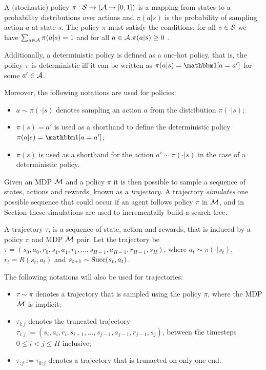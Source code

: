     \begin{defn}
        \label{def:policy}
        A \textnormal{(stochastic) policy} $\pi:\mathcal{S}\rightarrow (\mathcal{A} \rightarrow [0,1])$ is a mapping from states to a probability distributions over actions and $\pi(a|s)$ is the probability of sampling action $a$ at state $s$. The policy $\pi$ must satisfy the conditions: for all $s \in \mathcal{S}$ we have $\sum_{a\in\mathcal{A}} \pi(a|s) = 1$ and for all $a\in\mathcal{A}. \pi(a|s)\geq 0$ . 
        
        Additionally, a \textnormal{deterministic policy} is defined as a one-hot policy, that is, the policy $\pi$ is deterministic iff it can be written as $\pi(a|s)=\one[a=a']$ for some $a'\in\mathcal{A}$.

        Moreover, the following notations are used for policies:
        \begin{itemize}
            \item $a\sim\pi(\cdot|s)$ denotes sampling an action $a$ from the distribution $\pi(\cdot|s)$;
            \item $\pi(s)=a'$ is used as a shorthand to define the deterministic policy $\pi(a|s)=\one[a=a']$; 
            \item $\pi(s)$ is used as a shorthand for the action $a'\sim\pi(\cdot|s)$ in the case of a deterministic policy.
        \end{itemize}
    \end{defn}
    
    Given an MDP $\mathcal{M}$ and a policy $\pi$ it is then possible to sample a sequence of states, actions and rewards, known as a \textit{trajectory}. A trajectory \textit{simulates} one possible sequence that could occur if an agent follows policy $\pi$ in $\mathcal{M}$, and in Section  these simulations are used to incrementally build a search tree.
    
    \begin{defn}
        \label{def:trajectory}
        A \textnormal{trajectory} $\tau$, is a sequence of state, action and rewards, that is induced by a policy $\pi$ and MDP $\mathcal{M}$ pair. Let the trajectory be $\tau = (s_0, a_0, r_0, s_1, a_1, r_1, ..., s_{H-1}, a_{H-1}, r_{H-1}, s_H)$, where $a_t \sim \pi(\cdot|s_t)$, $r_t=R(s_t,a_t)$ and $s_{t+1} \sim {\textnormal{Succ}(s_t,a_t)}$. 
        
        The following notations will also be used for trajectories:
        \begin{itemize}
            \item $\tau\sim\pi$ denotes a trajectory that is sampled using the policy $\pi$, where the MDP $\mathcal{M}$ is implicit;
            \item $\tau_{i:j}$ denotes the \textnormal{truncated trajectory} $\tau_{i:j}:=(s_i, a_i, r_i, s_{i+1}, ..., s_{j-1}, a_{j-1}, r_{j-1}, s_j)$, between the timesteps $0\leq i < j \leq H$ inclusive;
            \item $\tau_{:j}:=\tau_{0:j}$ denotes a trajectory that is trunacted on only one end.
        \end{itemize}
    \end{defn}

